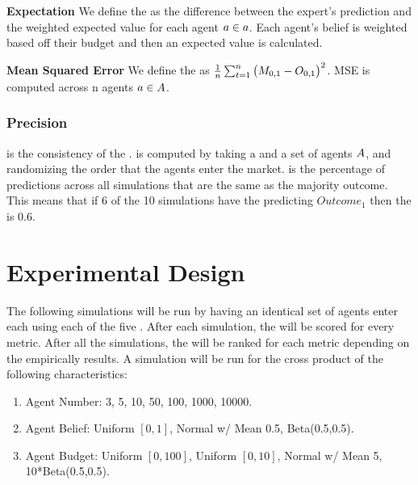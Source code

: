\textbf{Expectation}
We define the  as the difference between the expert's prediction
and the weighted expected value for each agent $a\in a$. Each agent's belief is weighted
based off their budget and then an expected value is calculated.

\textbf{Mean Squared Error}
We define the  as $\frac{1}{n}\sum_{t=1}^{n} \big(M_{0,1} - O_{0,1}\big)^2$. MSE
is computed across n agents $a\in A$. 

\subsubsection{Precision}
 is the consistency of the .  is computed by taking a 
and a set of agents $A$, and randomizing the order that the agents enter the market.  is the
percentage of predictions across all simulations that are the same as the majority outcome. This means that if 6 of
the 10 simulations have the  predicting $Outcome_{1}$ then the  is 0.6.

\section{Experimental Design}
The following simulations will be run by having an identical set of agents enter each  using each
of the five . After each simulation, the  will be scored for every
metric. After all the simulations, the  will be ranked for each metric depending on the empirically
results. A simulation will be run for the cross product of the following characteristics:
\begin{enumerate}
  \item Agent Number: 3, 5, 10, 50, 100, 1000, 10000.
  \item Agent Belief: Uniform $[0,1]$, Normal w/ Mean 0.5, Beta(0.5,0.5).
  \item Agent Budget: Uniform $[0,100]$, Uniform $[0,10]$, Normal w/ Mean 5, 10*Beta(0.5,0.5).
\end{enumerate}
\fi